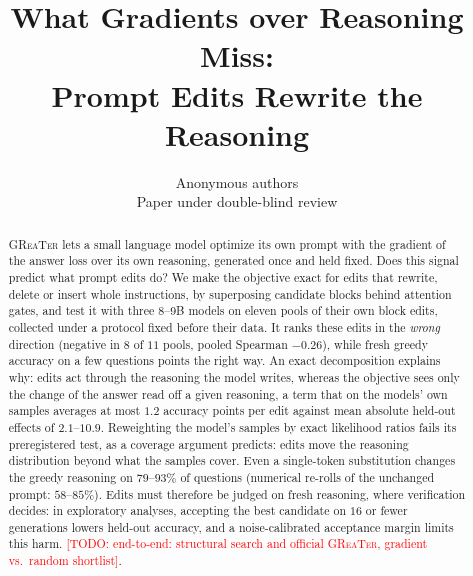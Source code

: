 \documentclass{article}
\title{What Gradients over Reasoning Miss:\\ Prompt Edits Rewrite the Reasoning}
\author{Anonymous authors\\Paper under double-blind review}
\newcommand{\greater}{\textsc{GReaTer}}
\newcommand{\todo}[1]{\textcolor{red}{[TODO: #1]}}
\begin{document}
\maketitle

\begin{abstract}
\greater{} lets a small language model optimize its own prompt with the gradient of the answer
loss over its own reasoning, generated once and held fixed. Does this signal predict what prompt
edits do? We make the objective exact for edits that rewrite, delete or insert whole instructions,
by superposing candidate blocks behind attention gates, and test it with three \mbox{8--9B} models
on eleven pools of their own block edits, collected under a protocol fixed before their data. It
ranks these edits in the \emph{wrong} direction (negative in $8$ of $11$ pools, pooled Spearman
$-0.26$), while fresh greedy accuracy on a few questions points the right way. An exact
decomposition explains why: edits act through the reasoning the model writes, whereas the objective
sees only the change of the answer read off a given reasoning, a term that on the models' own
samples averages at most $1.2$ accuracy points per edit against mean absolute held-out effects of
$2.1$--$10.9$. Reweighting the model's samples by exact likelihood ratios fails its preregistered
test, as a coverage argument predicts: edits move the reasoning distribution beyond what the
samples cover. Even a single-token substitution changes the greedy reasoning on $79$--$93\%$ of
questions (numerical re-rolls of the unchanged prompt: $58$--$85\%$). Edits must therefore be
judged on fresh reasoning, where verification decides: in exploratory analyses, accepting the best
candidate on $16$ or fewer generations lowers held-out accuracy, and a noise-calibrated acceptance
margin limits this harm. \todo{end-to-end: structural search and official \greater{}, gradient vs.\
random shortlist}.
\end{abstract}










\label{main-text-end}%
\end{document}
